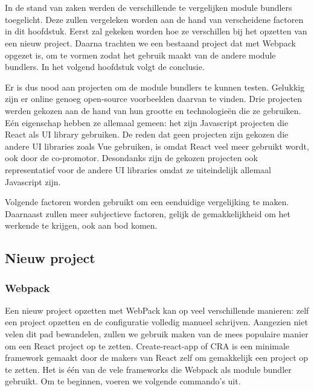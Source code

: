
\chapter{}
\label{ch:methodologie}

In de stand van zaken werden de verschillende te vergelijken module bundlers toegelicht. Deze zullen vergeleken worden aan de hand van verscheidene factoren in dit hoofdstuk. 
Eerst zal gekeken worden hoe ze verschillen bij het opzetten van een nieuw project. Daarna trachten we een bestaand project dat met Webpack opgezet is, om te vormen zodat het gebruik maakt van de andere module bundlers. In het volgend hoofdstuk volgt de conclusie.

Er is dus nood aan projecten om de module bundlers te kunnen testen. Gelukkig zijn er online genoeg open-source voorbeelden daarvan te vinden. Drie projecten werden gekozen aan de hand van hun grootte en technologieën die ze gebruiken. Eén eigenschap hebben ze allemaal gemeen: het zijn Javascript projecten die React als UI library gebruiken. De reden dat geen projecten zijn gekozen die andere UI libraries zoals Vue gebruiken, is omdat React veel meer gebruikt wordt, ook door de co-promotor. Desondanks zijn de gekozen projecten ook representatief voor de andere UI libraries omdat ze uiteindelijk allemaal Javascript zijn. 

Volgende factoren worden gebruikt om een eenduidige vergelijking te maken. Daarnaast zullen meer subjectieve factoren, gelijk de gemakkelijkheid om het werkende te krijgen, ook aan bod komen.

\section{Nieuw project}
\subsection{Webpack}
Een nieuw project opzetten met WebPack kan op veel verschillende manieren: zelf een project opzetten en de configuratie volledig manueel schrijven. Aangezien niet velen dit pad bewandelen, zullen we gebruik maken van de mees populaire manier om een React project op te zetten. Create-react-app of CRA is een minimale framework gemaakt door de makers van React zelf om gemakkelijk een project op te zetten. Het is één van de vele frameworks die Webpack als module bundler gebruikt. Om te beginnen, voeren we volgende commando’s uit. 

